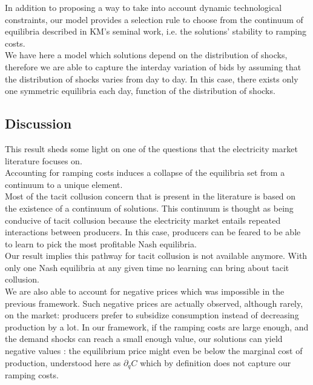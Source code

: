 In addition to proposing a way to take into account dynamic technological constraints, our model provides a selection rule to choose from the continuum of equilibria described in KM's seminal work, i.e. the solutions' stability to ramping costs.\\

We have here a model which solutions depend on the distribution of shocks, therefore we are able to capture the interday variation of bids by assuming that the distribution of shocks varies from day to day. In this case, there exists only one symmetric equilibria each day, function of the distribution of shocks.\\

\subsection{Discussion}

This result sheds some light on one of the questions that the electricity market literature focuses on. \\

Accounting for ramping costs induces a collapse of the equilibria set from a continuum to a unique element. \\

Most of the tacit collusion concern that is present in the literature is based on the existence of a continuum of solutions. This continuum is thought as being conducive of tacit collusion because the electricity market entails repeated interactions between producers. In this case, producers can be feared to be able to learn to pick the most profitable Nash equilibria. \\

Our result implies this pathway for tacit collusion is not available anymore. With only one Nash equilibria at any given time no learning can bring about tacit collusion. \\

We are also able to account for negative prices which was impossible in the previous framework. Such negative prices are actually observed, although rarely, on the market: producers prefer to subsidize consumption instead of decreasing production by a lot. In our framework, if the ramping costs are large enough, and the demand shocks can reach a small enough value, our solutions can yield negative values : the equilibrium price might even be below the marginal cost of production, understood here as $\partial_q C$ which by definition does not capture our ramping costs.

